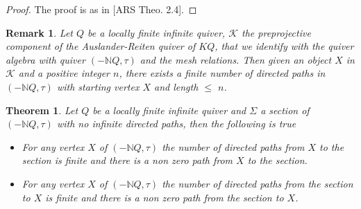 \documentclass{amsart}
\newtheorem{theorem}{Theorem}
\theoremstyle{plain}
\newtheorem{remark}{Remark}
\numberwithin{equation}{section}
\begin{document}
\begin{proof}
The proof is as in [ARS Theo. 2.4].
\end{proof}

\begin{remark}
Let $Q$ be a locally finite infinite quiver, $\mathcal{K}$ the preprojective
component of the Auslander-Reiten quiver of $KQ$, that we identify with the
quiver algebra with quiver $(-\mathbb{N}Q,\tau )$ and the mesh relations.
Then given an object $X$ in $\mathcal{K}$ and a positive integer $n$, there
exists a finite number of directed paths in $(-\mathbb{N}Q,\tau )$ with
starting vertex $X$ and length $\leq $ $n$.
\end{remark}

\begin{theorem}
\label{directedpaths1} Let $Q$ be a locally finite infinite quiver and $\Sigma $ a section of $(-\mathbb{N}Q,\tau )$ with no infinite directed
paths, then the following is true

\begin{itemize}
\item[(a)] For any vertex $X$ of $(-\mathbb{N}Q,\tau )$ the number of
directed paths from $X$ to the section is finite and there is a non zero
path from $X$ to the section.

\item[(b)] For any vertex $X$ of $(-\mathbb{N}Q,\tau )$ the number of
directed paths from the section to $X$ is finite and there is a non zero
path from the section to $X$.
\end{itemize}
\end{theorem}
\end{document}
